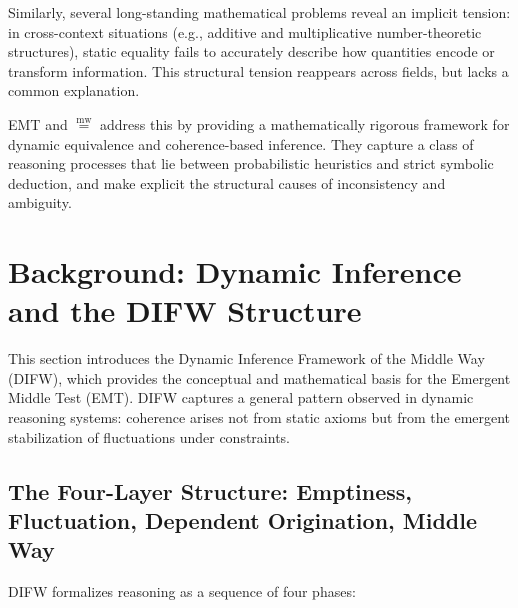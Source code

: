 \documentclass[11pt]{article}
\newcommand{\mweq}{\mathrel{\overset{\mathrm{mw}}{=}}}
\theoremstyle{definition}
\theoremstyle{remark}
\begin{document}
Similarly, several long-standing mathematical problems reveal
an implicit tension: in cross-context situations (e.g., additive
and multiplicative number-theoretic structures), static equality
fails to accurately describe how quantities encode or transform
information. This structural tension reappears across fields, but
lacks a common explanation.

EMT and $\mweq$ address this by providing a mathematically rigorous
framework for dynamic equivalence and coherence-based inference.
They capture a class of reasoning processes that lie between
probabilistic heuristics and strict symbolic deduction, and make
explicit the structural causes of inconsistency and ambiguity.

\section{Background: Dynamic Inference and the DIFW Structure}

This section introduces the Dynamic Inference Framework of the
Middle Way (DIFW), which provides the conceptual and mathematical
basis for the Emergent Middle Test (EMT). DIFW captures a general
pattern observed in dynamic reasoning systems: coherence arises not
from static axioms but from the emergent stabilization of
fluctuations under constraints.

\subsection{The Four-Layer Structure: Emptiness, Fluctuation,
Dependent Origination, Middle Way}

DIFW formalizes reasoning as a sequence of four phases:
\end{document}
